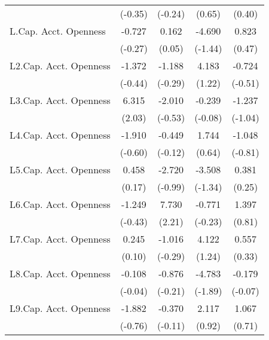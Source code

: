 {\begin{longtable}{l*{4}{c}}
                &  (-0.35)         &  (-0.24)         &   (0.65)         &   (0.40)         \\
[1em]
L.Cap. Acct. Openness&   -0.727         &    0.162         &   -4.690         &    0.823         \\
                &  (-0.27)         &   (0.05)         &  (-1.44)         &   (0.47)         \\
[1em]
L2.Cap. Acct. Openness&   -1.372         &   -1.188         &    4.183         &   -0.724         \\
                &  (-0.44)         &  (-0.29)         &   (1.22)         &  (-0.51)         \\
[1em]
L3.Cap. Acct. Openness&    6.315\sym{*}  &   -2.010         &   -0.239         &   -1.237         \\
                &   (2.03)         &  (-0.53)         &  (-0.08)         &  (-1.04)         \\
[1em]
L4.Cap. Acct. Openness&   -1.910         &   -0.449         &    1.744         &   -1.048         \\
                &  (-0.60)         &  (-0.12)         &   (0.64)         &  (-0.81)         \\
[1em]
L5.Cap. Acct. Openness&    0.458         &   -2.720         &   -3.508         &    0.381         \\
                &   (0.17)         &  (-0.99)         &  (-1.34)         &   (0.25)         \\
[1em]
L6.Cap. Acct. Openness&   -1.249         &    7.730\sym{*}  &   -0.771         &    1.397         \\
                &  (-0.43)         &   (2.21)         &  (-0.23)         &   (0.81)         \\
[1em]
L7.Cap. Acct. Openness&    0.245         &   -1.016         &    4.122         &    0.557         \\
                &   (0.10)         &  (-0.29)         &   (1.24)         &   (0.33)         \\
[1em]
L8.Cap. Acct. Openness&   -0.108         &   -0.876         &   -4.783         &   -0.179         \\
                &  (-0.04)         &  (-0.21)         &  (-1.89)         &  (-0.07)         \\
[1em]
L9.Cap. Acct. Openness&   -1.882         &   -0.370         &    2.117         &    1.067         \\
                &  (-0.76)         &  (-0.11)         &   (0.92)         &   (0.71)         \\

\end{longtable}}
